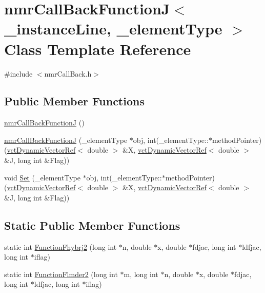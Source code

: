 \hypertarget{classnmr_call_back_function_j}{}\section{nmr\+Call\+Back\+Function\+J$<$ \+\_\+instance\+Line, \+\_\+element\+Type $>$ Class Template Reference}
\label{classnmr_call_back_function_j}


{\ttfamily \#include $<$nmr\+Call\+Back.\+h$>$}

\subsection*{Public Member Functions}
\begin{DoxyCompactItemize}
\item 
\hyperlink{classnmr_call_back_function_j_a935a12ef94208ca1d3477fdc0641e787}{nmr\+Call\+Back\+Function\+J} ()
\item 
\hyperlink{classnmr_call_back_function_j_acfaac5bff2385305e86e38f283b817ea}{nmr\+Call\+Back\+Function\+J} (\+\_\+element\+Type $\ast$obj, int(\+\_\+element\+Type\+::$\ast$method\+Pointer)(\hyperlink{classvct_dynamic_vector_ref}{vct\+Dynamic\+Vector\+Ref}$<$ double $>$ \&X, \hyperlink{classvct_dynamic_vector_ref}{vct\+Dynamic\+Vector\+Ref}$<$ double $>$ \&J, long int \&Flag))
\item 
void \hyperlink{classnmr_call_back_function_j_ab11fa256ca6faac63f6926e19a597737}{Set} (\+\_\+element\+Type $\ast$obj, int(\+\_\+element\+Type\+::$\ast$method\+Pointer)(\hyperlink{classvct_dynamic_vector_ref}{vct\+Dynamic\+Vector\+Ref}$<$ double $>$ \&X, \hyperlink{classvct_dynamic_vector_ref}{vct\+Dynamic\+Vector\+Ref}$<$ double $>$ \&J, long int \&Flag))
\end{DoxyCompactItemize}
\subsection*{Static Public Member Functions}
\begin{DoxyCompactItemize}
\item 
static int \hyperlink{classnmr_call_back_function_j_a6799a87a71430f4ef46eb065763930cc}{Function\+Fhybrj2} (long int $\ast$n, double $\ast$x, double $\ast$fdjac, long int $\ast$ldfjac, long int $\ast$iflag)
\item 
static int \hyperlink{classnmr_call_back_function_j_ad1165c6db8769ebdaf8cd414dd33f2c8}{Function\+Flmder2} (long int $\ast$m, long int $\ast$n, double $\ast$x, double $\ast$fdjac, long int $\ast$ldfjac, long int $\ast$iflag)
\end{DoxyCompactItemize}
